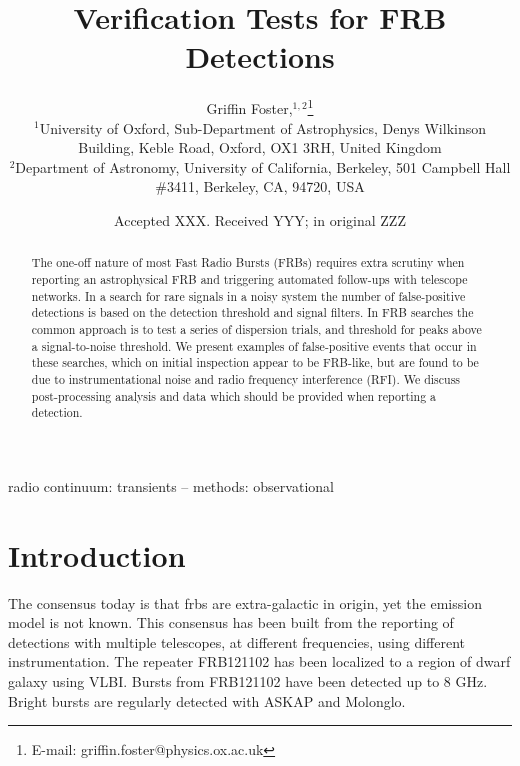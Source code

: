 \documentclass[a4paper,fleqn,usenatbib]{mnras}
\title[Verification Tests for FRB Detections]{Verification Tests for FRB
Detections}
\author[G. Foster et al.]{
Griffin Foster,$^{1,2}$\thanks{E-mail: griffin.foster@physics.ox.ac.uk}
\\
$^{1}$University of Oxford, Sub-Department of Astrophysics, Denys Wilkinson Building, Keble Road, Oxford, OX1 3RH, United Kingdom\\
$^{2}$Department of Astronomy, University of California, Berkeley, 501 Campbell
Hall \#3411, Berkeley, CA, 94720, USA\\
}
\date{Accepted XXX. Received YYY; in original ZZZ}
\begin{document}
\label{firstpage}
\pagerange{\pageref{firstpage}--\pageref{lastpage}}
\maketitle

\begin{abstract}
The one-off nature of most Fast Radio Bursts (FRBs) requires extra scrutiny when
reporting an astrophysical FRB and triggering automated follow-ups with
telescope networks.  In a search for rare signals in a noisy system the number
of false-positive detections is based on the detection threshold and signal
filters. In FRB searches the common approach is to test a series of dispersion
trials, and threshold for peaks above a signal-to-noise threshold.  We present
examples of false-positive events that occur in these searches, which on initial
inspection appear to be FRB-like, but are found to be due to instrumentational
noise and radio frequency interference (RFI). We discuss post-processing
analysis and data which should be provided when reporting a detection.
\end{abstract}

\begin{keywords}
radio continuum: transients -- methods: observational
\end{keywords}


\section{Introduction}
\label{sec:intro}


The consensus today is that \glspl{frb} are extra-galactic in origin, yet the
emission model is not known. This consensus has been built from the reporting of
detections with multiple telescopes, at different frequencies, using different
instrumentation. The repeater FRB121102 has been localized to a region of dwarf
galaxy using VLBI. Bursts from FRB121102 have been detected up to 8 GHz. Bright
bursts are regularly detected with ASKAP and Molonglo. 
\end{document}
